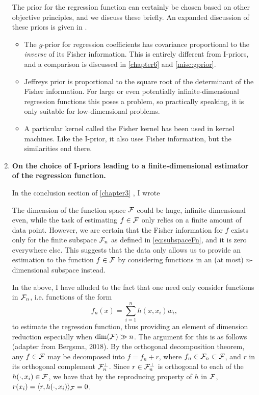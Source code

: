\documentclass[11pt,openright,twoside]{report}
\begin{document}
\begin{enumerate}
  The prior for the regression function can certainly be chosen based on other objective principles, and we discuss these briefly.
  An expanded discussion of these priors is given in \citet{bergsma2017}.
  \begin{itemize}
    \item The $g$-prior \citep{zellner1986assessing} for regression coefficients has covariance proportional to the \emph{inverse} of its Fisher information. This is entirely different from I-priors, and a comparison is discussed in \cref{chapter6} and \cref{misc:gprior}.
    \item Jeffreys prior \citep{jeffreys1946invariant} is proportional to the square root of the determinant of the Fisher information. For large or even potentially infinite-dimensional regression functions this poses a problem, so practically speaking, it is only suitable for low-dimensional problems.
    \item A particular kernel called the Fisher kernel has been used in kernel machines. Like the I-prior, it also uses Fisher information, but the similarities end there. 
  \end{itemize}
  
  \item \textbf{On the choice of I-priors leading to a finite-dimensional estimator of the regression function.}
  
  In the conclusion section of \cref{chapter3} , I wrote
  
  \begin{displayquote}
The dimension of the function space ${\mathcal F}$ could be huge, infinite dimensional even, while the task of estimating $f\in{\mathcal F}$ only relies on a finite amount of data point.
However, we are certain that the Fisher information for $f$ exists only for the finite subspace ${\mathcal F}_n$ as defined in \cref{eq:subspaceFn}, and it is zero everywhere else.
This suggests that the data only allows us to provide an estimation to the function $f\in{\mathcal F}$ by considering functions in an (at most) $n$-dimensional subspace instead.
\end{displayquote}
  
  In the above, I have alluded to the fact that one need only consider functions in ${\mathcal F}_n$, i.e. functions of the form
  \begin{equation}
    f_n(x) = \sum_{i=1}^n h(x,x_i)w_i,
  \end{equation}
  to estimate the regression function, thus providing an element of dimension reduction especially when $\dim({\mathcal F}) \gg n$.
  The argument for this is as follows (adapter from Bergsma, 2018).
  By the orthogonal decomposition theorem, any $f\in{\mathcal F}$ may be decomposed into $f = f_n + r$, where $f_n\in{\mathcal F}_n\subset {\mathcal F}$, and $r$ in its orthogonal complement ${\mathcal F}_n^\bot$.
  Since $r\in{\mathcal F}_n^\bot$ is orthogonal to each of the $h(\cdot,x_i)\in{\mathcal F}$, we have that by the reproducing property of $h$ in ${\mathcal F}$, $r(x_i)=\langle r, h(\cdot,x_i)\rangle_{\mathcal F}=0$.
  

\end{enumerate}
\end{document}
